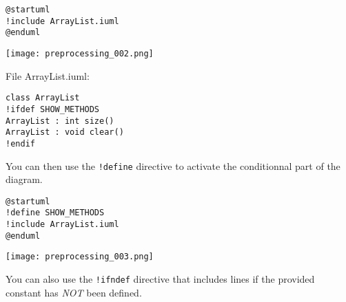 \begin{lstlisting}
@startuml
!include ArrayList.iuml
@enduml 
\end{lstlisting}

\begin{center}
\texttt{[image: preprocessing\_002.png]}
\end{center}


File ArrayList.iuml: 
\begin{lstlisting}
class ArrayList
!ifdef SHOW_METHODS 
ArrayList : int size()
ArrayList : void clear()
!endif 
\end{lstlisting}



You can then use the \texttt{!define} directive to activate the conditionnal
part of the diagram.

\begin{lstlisting}
@startuml
!define SHOW_METHODS 
!include ArrayList.iuml
@enduml 
\end{lstlisting}

\begin{center}
\texttt{[image: preprocessing\_003.png]}
\end{center}


You can also use the \texttt{!ifndef} directive that includes lines if the
provided constant has \textit{NOT} been defined. 

